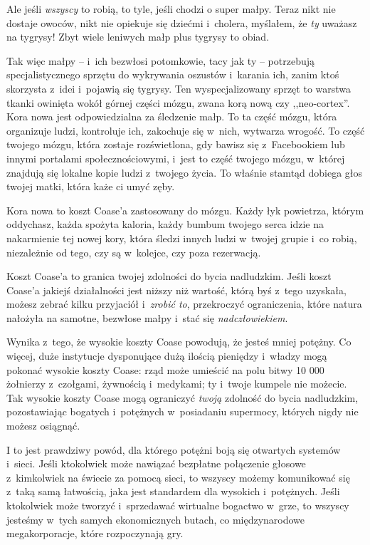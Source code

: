 \documentclass[oneside,polish,11pt,rmheadings]{mwbk}
\begin{document}
Ale jeśli \textit{wszyscy }to robią, to tyle, jeśli chodzi o super małpy. Teraz nikt nie dostaje owoców, nikt nie opiekuje się dziećmi i~cholera, myślałem, że \textit{ty} uważasz na tygrysy! Zbyt wiele leniwych małp plus tygrysy to obiad.

Tak więc małpy -- i~ich bezwłosi potomkowie, tacy jak ty -- potrzebują specjalistycznego sprzętu do wykrywania oszustów i~karania ich, zanim ktoś skorzysta z~idei i~pojawią się tygrysy. Ten wyspecjalizowany sprzęt to warstwa tkanki owinięta wokół górnej części mózgu, zwana korą nową czy ,,neo-cortex''. Kora nowa jest odpowiedzialna za śledzenie małp. To ta część mózgu, która organizuje ludzi, kontroluje ich, zakochuje się w~nich, wytwarza wrogość. To część twojego mózgu, która zostaje rozświetlona, gdy bawisz się z~Facebookiem lub innymi portalami społecznościowymi, i~jest to część twojego mózgu, w~której znajdują się lokalne kopie ludzi z~twojego życia. To właśnie stamtąd dobiega głos twojej matki, która każe ci umyć zęby.

Kora nowa to koszt Coase'a zastosowany do mózgu. Każdy łyk powietrza, którym oddychasz, każda spożyta kaloria, każdy bumbum twojego serca idzie na nakarmienie tej nowej kory, która śledzi innych ludzi w~twojej grupie i~co robią, niezależnie od tego, czy są w~kolejce, czy poza rezerwacją.

Koszt Coase'a to granica twojej zdolności do bycia nadludzkim. Jeśli koszt Coase'a jakiejś działalności jest niższy niż wartość, którą byś z~tego uzyskała, możesz zebrać kilku przyjaciół i~\textit{zrobić to}, przekroczyć ograniczenia, które natura nałożyła na samotne, bezwłose małpy i~stać się \textit{nadczłowiekiem}.

Wynika z~tego, że wysokie koszty Coase powodują, że jesteś mniej potężny. Co więcej, duże instytucje dysponujące dużą ilością pieniędzy i~władzy mogą pokonać wysokie koszty Coase: rząd może umieścić na polu bitwy 10 000 żołnierzy z~czołgami, żywnością i~medykami; ty i~twoje kumpele nie możecie. Tak wysokie koszty Coase mogą ograniczyć \textit{twoją }zdolność do bycia nadludzkim, pozostawiając bogatych i~potężnych w~posiadaniu supermocy, których nigdy nie możesz osiągnąć.

I to jest prawdziwy powód, dla którego potężni boją się otwartych systemów i~sieci. Jeśli ktokolwiek może nawiązać bezpłatne połączenie głosowe z~kimkolwiek na świecie za pomocą sieci, to wszyscy możemy komunikować się z~taką samą łatwością, jaka jest standardem dla wysokich i~potężnych. Jeśli ktokolwiek może tworzyć i~sprzedawać wirtualne bogactwo w~grze, to wszyscy jesteśmy w~tych samych ekonomicznych butach, co międzynarodowe megakorporacje, które rozpoczynają gry.
\end{document}
